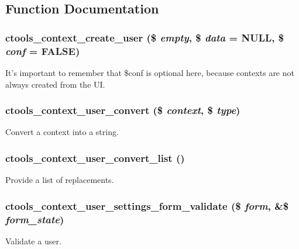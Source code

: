 \subsection{Function Documentation}
\hypertarget{user_8inc_a0abeb33ef10a6010f433559307dd2e48}{
\subsubsection[{ctools\_\-context\_\-create\_\-user}]{\setlength{\rightskip}{0pt plus 5cm}ctools\_\-context\_\-create\_\-user (\$ {\em empty}, \/  \$ {\em data} = {\ttfamily NULL}, \/  \$ {\em conf} = {\ttfamily FALSE})}}
\label{user_8inc_a0abeb33ef10a6010f433559307dd2e48}
It's important to remember that \$conf is optional here, because contexts are not always created from the UI. \hypertarget{user_8inc_a818b09f1b7037df77bf28e1748dfcdcb}{
\subsubsection[{ctools\_\-context\_\-user\_\-convert}]{\setlength{\rightskip}{0pt plus 5cm}ctools\_\-context\_\-user\_\-convert (\$ {\em context}, \/  \$ {\em type})}}
\label{user_8inc_a818b09f1b7037df77bf28e1748dfcdcb}
Convert a context into a string. \hypertarget{user_8inc_a876ddbeabf0ebae4a9af6144c336492a}{
\subsubsection[{ctools\_\-context\_\-user\_\-convert\_\-list}]{\setlength{\rightskip}{0pt plus 5cm}ctools\_\-context\_\-user\_\-convert\_\-list ()}}
\label{user_8inc_a876ddbeabf0ebae4a9af6144c336492a}
Provide a list of replacements. \hypertarget{user_8inc_a6388a4541075fe441b3da787df5c07ba}{
\subsubsection[{ctools\_\-context\_\-user\_\-settings\_\-form\_\-validate}]{\setlength{\rightskip}{0pt plus 5cm}ctools\_\-context\_\-user\_\-settings\_\-form\_\-validate (\$ {\em form}, \/  \&\$ {\em form\_\-state})}}
\label{user_8inc_a6388a4541075fe441b3da787df5c07ba}
Validate a user. 

